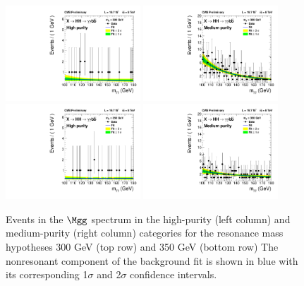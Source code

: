 \begin{figure}[htbp!]
 \begin{center}
   \includegraphics[width=0.45\textwidth]{figures/results/databkgoversig_cat0_300GeV.pdf}
   \includegraphics[width=0.45\textwidth]{figures/results/databkgoversig_cat1_300GeV.pdf}
   \includegraphics[width=0.45\textwidth]{figures/results/databkgoversig_cat0_350GeV.pdf}
   \includegraphics[width=0.45\textwidth]{figures/results/databkgoversig_cat1_350GeV.pdf}
 \end{center}
\caption{Events in the $\Mgg$ spectrum in the high-purity (left column) and medium-purity
(right column) categories for the resonance mass hypotheses 300 GeV (top row) and 350 GeV (bottom row)
The nonresonant component of the background fit is shown in blue
with its corresponding 1$\sigma$ and 2$\sigma$ confidence intervals.}
\label{fig:datafit_300}
\end{figure}

